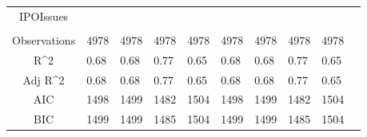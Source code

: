 \documentclass{article}
\begin{document}
\begin{table}[H]
\begin{tabular}{|clllllllll|}
  IPOIssues &  &  &  &  &  &  &  &  & \\ 
   &  &  &  &  &  &  &  &  & \\ 
  \hline 
 Observations & 4978 & 4978 & 4978 & 4978 & 4978 & 4978 & 4978 & 4978 & \\ 
  R^2 & 0.68 & 0.68 & 0.77 & 0.65 & 0.68 & 0.68 & 0.77 & 0.65 & \\ 
  Adj R^2 & 0.68 & 0.68 & 0.77 & 0.65 & 0.68 & 0.68 & 0.77 & 0.65 & \\ 
  AIC & 1498 & 1499 & 1482 & 1504 & 1498 & 1499 & 1482 & 1504 & \\ 
  BIC & 1499 & 1499 & 1485 & 1504 & 1499 & 1499 & 1485 & 1504 & \\ 
   \hline
\end{tabular}
 
\end{table}
\end{document}
